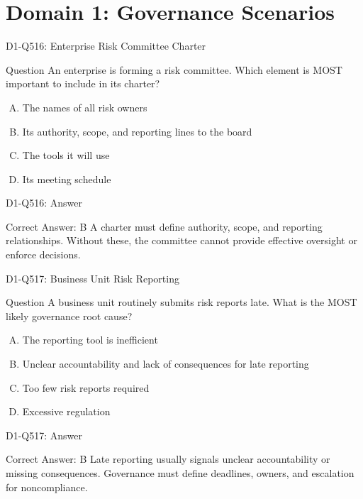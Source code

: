 \documentclass{beamer}
\begin{document}
\section{Domain 1: Governance Scenarios}

\begin{frame}{D1-Q516: Enterprise Risk Committee Charter}
	\begin{block}{Question}
		An enterprise is forming a risk committee. Which element is MOST important to include in its charter?
	\end{block}
	\begin{enumerate}[(A)]
		\item The names of all risk owners
		\item Its authority, scope, and reporting lines to the board
		\item The tools it will use
		\item Its meeting schedule
	\end{enumerate}
\end{frame}
\begin{frame}{D1-Q516: Answer}
	\begin{block}{Correct Answer: B}
		A charter must define authority, scope, and reporting relationships. Without these, the committee cannot provide effective oversight or enforce decisions.
	\end{block}
\end{frame}

\begin{frame}{D1-Q517: Business Unit Risk Reporting}
	\begin{block}{Question}
		A business unit routinely submits risk reports late. What is the MOST likely governance root cause?
	\end{block}
	\begin{enumerate}[(A)]
		\item The reporting tool is inefficient
		\item Unclear accountability and lack of consequences for late reporting
		\item Too few risk reports required
		\item Excessive regulation
	\end{enumerate}
\end{frame}
\begin{frame}{D1-Q517: Answer}
	\begin{block}{Correct Answer: B}
		Late reporting usually signals unclear accountability or missing consequences. Governance must define deadlines, owners, and escalation for noncompliance.
	\end{block}
\end{frame}
\end{document}
